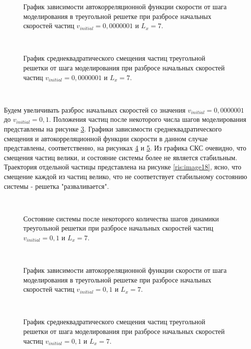 \documentclass[14pt,a4paper,report]{ncc}
\begin{document}
\begin{figure}[tbp]
\caption{График зависимости автокорреляционной функции скорости от шага моделирования в треугольной решетке при разбросе начальных скоростей частиц $v_{initial} = 0,0000001 $ и  $L_x=7$.}
\label{ris:image13}
\end{figure}
\

\begin{figure}[tbp]
\caption{График среднеквадратического смещения частиц треугольной решетки от шага моделирования при разбросе начальных скоростей частиц  $v_{initial} = 0,0000001 $ и  $L_x=7$.}
\label{ris:image14}
\end{figure}
\




Будем увеличивать разброс начальных скоростей со значения $v_{initial} = 0,0000001 $ до  $v_{initial} = 0,1 $. Положения частиц после некоторого числа шагов моделирования представлены на рисунке \ref{ris:image15}. Графики зависимости среднеквадратического смещения и автокорреляционной функции скорости в данном случае представлены, соответственно, на рисунках \ref{ris:image16} и \ref{ris:image17}. Из графика СКС очевидно, что смещения частиц велики, и состояние системы более не является стабильным. Траектория отдельной частицы представлена на рисунке \ref{ris:image18}, ясно, что смещение каждой из частиц велико, что не соответствует стабильному состоянию системы - решетка "разваливается".

\

\begin{figure}[h]
\caption{Состояние системы после некоторого количества шагов динамики треугольной решетки при разбросе начальных скоростей частиц $v_{initial} = 0,1 $ и   $L_x=7$.}
\label{ris:image15}
\end{figure}
\

\begin{figure}[tbp]
\caption{График зависимости автокорреляционной функции скорости от шага моделирования в треугольной решетке при разбросе начальных скоростей частиц $v_{initial} = 0,1 $ и  $L_x=7$.}
\label{ris:image16}
\end{figure}
\

\begin{figure}[tbp]
\caption{График среднеквадратического смещения частиц треугольной решетки от шага моделирования при разбросе начальных скоростей частиц  $v_{initial} = 0,1 $ и  $L_x=7$.}
\label{ris:image17}
\end{figure}
\
\end{document}

